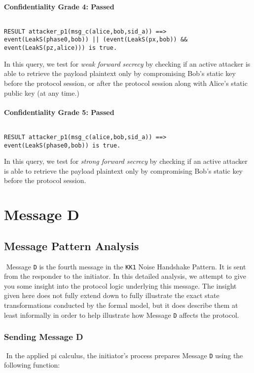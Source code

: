 \paragraph{Confidentiality Grade 4: Passed}$ $
\begin{lstlisting}
RESULT attacker_p1(msg_c(alice,bob,sid_a)) ==> event(LeakS(phase0,bob)) || (event(LeakS(px,bob)) && event(LeakS(pz,alice))) is true.
\end{lstlisting}

In this query, we test for \emph{weak forward secrecy} by checking if an active attacker is able to retrieve the payload plaintext only by compromising Bob's static key before the protocol session, or after the protocol session along with Alice's static public key (at any time.)


\paragraph{Confidentiality Grade 5: Passed}$ $
\begin{lstlisting}
RESULT attacker_p1(msg_c(alice,bob,sid_a)) ==> event(LeakS(phase0,bob)) is true.
\end{lstlisting}

In this query, we test for \emph{strong forward secrecy} by checking if an active attacker is able to retrieve the payload plaintext only by compromising Bob's static key before the protocol session.


\section{ Message D}

\subsection{Message Pattern Analysis}$ $
Message \texttt{D} is the fourth message in the \texttt{KK1} Noise Handshake Pattern. It is sent from the responder to the initiator. In this detailed analysis, we attempt to give you some insight into the protocol logic underlying this message. The insight given here does not fully extend down to fully illustrate the exact state transformations conducted by the formal model, but it does describe them at least informally in order to help illustrate how Message \texttt{D} affects the protocol.


\subsubsection{Sending Message D}$ $
In the applied pi calculus, the initiator's process prepares Message \texttt{D} using the following function:


